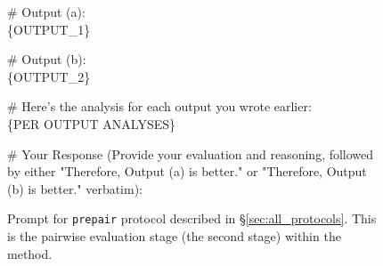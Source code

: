 \begin{figure*}[t!]
\begin{tcolorbox}[colback=black!3!white, colframe=black!70!white, title=Prepair (pairwise evaluation), fontupper=\footnotesize, fonttitle=\footnotesize]
\# Output (a): \\
\{OUTPUT\_1\}
\newline

\# Output (b): \\
\{OUTPUT\_2\}
\newline

\# Here's the analysis for each output you wrote earlier: \\
\{PER OUTPUT ANALYSES\}
\newline

\# Your Response (Provide your evaluation and reasoning, followed by either "Therefore, Output (a) is better." or "Therefore, Output (b) is better." verbatim):

\end{tcolorbox}
\caption{Prompt for \texttt{prepair} protocol described in \S\ref{sec:all_protocols}. This is the pairwise evaluation stage (the second stage) within the method.}
\label{fig:prompt_prepair_pairwise}
\end{figure*}





